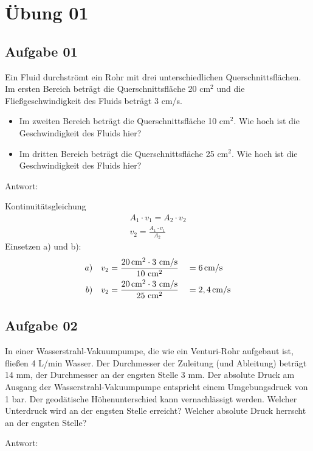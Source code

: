 \documentclass[a4paper,10pt]{article}
\newcommand{\answ}{{\color{miugray2}Antwort: \par \vspace*{-3mm} 
\hrulefill }\par }
\begin{document}
\sidebar
{}
\par \vspace*{5mm}


\section*{Übung 01}
\subsection*{Aufgabe 01}
Ein Fluid durchströmt ein Rohr mit drei unterschiedlichen Querschnittsflächen. 
Im ersten Bereich beträgt die Querschnittsfläche 20 cm$^2$ und die Fließgeschwindigkeit des Fluids beträgt 3 cm/s.
\begin{itemize}
\item[a] Im zweiten Bereich beträgt die Querschnittsfläche 10 cm$^2$. Wie hoch ist die Geschwindigkeit des Fluids hier?
\item[b] Im dritten Bereich beträgt die Querschnittsfläche 25 cm$^2$. Wie hoch ist die Geschwindigkeit des Fluids hier?
\end{itemize}  
\ppbig
{\color{miugray2}Antwort: \par \vspace*{-3mm} 
\hrulefill }\par 
\ppbig
Kontinuitätsgleichung
\begin{align*}
A_1 \cdot v_1 = A_2 \cdot v_2 \\
v_2 = \frac{A_1 \cdot v_1}{A_2}
\end{align*}
Einsetzen a) und b):
\begin{align*}
a) &&v_2 &= \frac{20\cm^2 \cdot 3\mskip3mu \cm/\text{s}}{10\mskip3mu \cm^2} &&= 6\cm/\text{s} \\
b) &&v_2 &= \frac{20\cm^2 \cdot 3\mskip3mu \cm/\text{s}}{25\mskip3mu \cm^2} &&=2,4\cm/\text{s}
\end{align*}


\pagebreak
\subsection*{Aufgabe 02}
In einer Wasserstrahl-Vakuumpumpe, die wie ein Venturi-Rohr aufgebaut ist, fließen 4 L/min Wasser. Der Durchmesser der Zuleitung (und Ableitung) beträgt 14 mm, der Durchmesser an der engsten Stelle 3 mm. Der absolute Druck am Ausgang der Wasserstrahl-Vakuumpumpe entspricht einem Umgebungsdruck von 1 bar. Der geodätische Höhenunterschied kann vernachlässigt werden. 
Welcher Unterdruck wird an der engsten Stelle erreicht? Welcher absolute Druck herrscht an der engsten Stelle?
\ppbig
\answ
\end{document}

